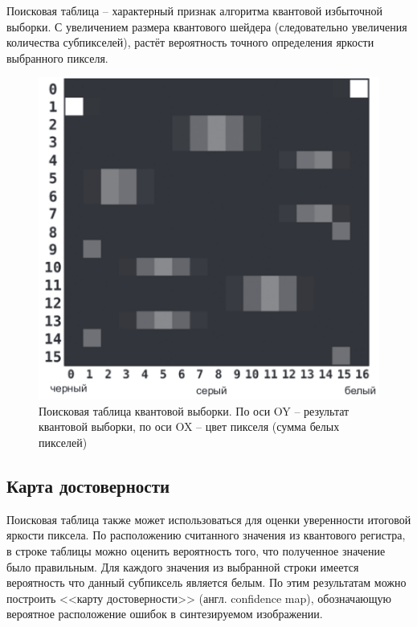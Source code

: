 Поисковая таблица -- характерный признак алгоритма квантовой избыточной выборки. С увеличением размера квантового шейдера (следовательно увеличения количества субпикселей), растёт вероятность точного определения яркости выбранного пикселя.

\begin{figure}[H]
	\begin{center}
		\includegraphics[scale=0.55]{img/qss_table.png}
	\end{center}
	\captionsetup{justification=centering}
	\caption{Поисковая таблица квантовой выборки. По оси OY -- результат квантовой выборки, по оси OX -- цвет пикселя (сумма белых пикселей)}
	\label{img:qss_table}
\end{figure}

\subsection{Карта достоверности}

Поисковая таблица также может использоваться для оценки уверенности итоговой яркости пиксела. По расположению считанного значения из квантового регистра, в строке таблицы можно оценить вероятность того, что полученное значение было правильным. Для каждого значения из выбранной строки имеется вероятность что данный субпиксель является белым. По этим результатам можно построить <<карту достоверности>> (англ. confidence map), обозначающую вероятное расположение ошибок в синтезируемом изображении.

